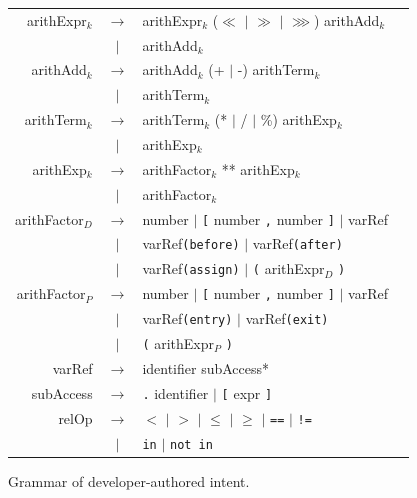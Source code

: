 \documentclass[11pt,oneside]{report}
\theoremstyle{plain}
\theoremstyle{definition}
\theoremstyle{remark}
\begin{document}
\begin{figure}[!t]
\begin{tabular}{@{}r@{\quad}c@{\quad}l@{\qquad}l@{}}
arithExpr$_k$
  & $\rightarrow$ &
    arithExpr$_k$ ($\ll$ $|$ $\gg$ $|$ $\ggg$) arithAdd$_k$
  & \\
  & $|$ & arithAdd$_k$
  & \\[2pt]

arithAdd$_k$
  & $\rightarrow$ &
    arithAdd$_k$ (+ $|$ -) arithTerm$_k$
  & \\
  & $|$ & arithTerm$_k$
  & \\[2pt]

arithTerm$_k$
  & $\rightarrow$ &
    arithTerm$_k$ (* $|$ / $|$ \%) arithExp$_k$
  & \\
  & $|$ & arithExp$_k$
  & \\[2pt]

arithExp$_k$
  & $\rightarrow$ &
    arithFactor$_k$ ** arithExp$_k$
  & \\
  & $|$ & arithFactor$_k$
  & \\[4pt]

arithFactor$_D$
  & $\rightarrow$ &
    number
    $|$ \texttt{[} number \texttt{,} number \texttt{]}
    $|$ varRef
  & \\
  & $|$ &
    varRef\texttt{(before)}
    $|$ varRef\texttt{(after)}
  & \\
  & $|$ &
    varRef\texttt{(assign)}
    $|$ \texttt{(} arithExpr$_D$ \texttt{)}
  & \\[4pt]

arithFactor$_P$
  & $\rightarrow$ &
    number
    $|$ \texttt{[} number \texttt{,} number \texttt{]}
    $|$ varRef
  & \\
  & $|$ &
    varRef\texttt{(entry)}
    $|$ varRef\texttt{(exit)}
  & \\
  & $|$ &
    \texttt{(} arithExpr$_P$ \texttt{)}
  & \\[4pt]

varRef
  & $\rightarrow$ & identifier subAccess* & \\[2pt]

subAccess
  & $\rightarrow$ &
    \texttt{.} identifier
    $|$ \texttt{[} expr \texttt{]}
  & \\[6pt]

relOp
  & $\rightarrow$ &
    $<$ $|$ $>$ $|$ $\leq$ $|$ $\geq$
    $|$ \texttt{==} $|$ \texttt{!=}
  & \\
  & $|$ &
    \texttt{in} $|$ \texttt{not in}
  & \\

\end{tabular}

\caption{
Grammar of developer-authored intent.
}
\label{fig:intent-grammar}
\end{figure}
\end{document}
